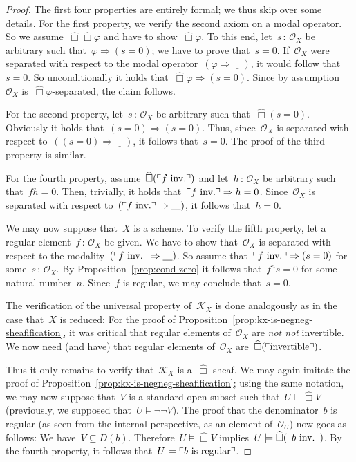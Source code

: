 \documentclass[10pt]{amsart}
\makeatletter
\theoremstyle{definition}
\theoremstyle{plain}
\theoremstyle{remark}
\renewcommand{\O}{\mathcal{O}}
\newcommand{\K}{\mathcal{K}}
\newcommand{\placeholder}{\underline{\quad}}
\newcommand{\?}{\,{:}\,}
\renewcommand{\_}{\mathpunct{.}\,}
\newcommand{\speak}[1]{\ulcorner\text{\textnormal{#1}}\urcorner}
\newcommand{\sdense}{{\widehat\Box}}
\newcommand{\inv}{inv.\@}
\newcommand{\notnot}{\emph{not not}\xspace}
\makeatother
\begin{document}
\begin{proof}The first four properties are entirely formal; we thus skip over
some details. For the first property, we verify the second axiom on a modal
operator. So we assume~$\sdense\sdense\varphi$ and have to show~$\sdense\varphi$. To
this end, let~$s\?\O_X$ be arbitrary such that~$\varphi \Rightarrow (s=0)$; we
have to prove that~$s = 0$. If~$\O_X$ were separated with respect to the modal
operator~$(\varphi \Rightarrow \placeholder)$, it would follow that~$s = 0$. So
unconditionally it holds that~$\sdense\varphi \Rightarrow (s=0)$. Since by
assumption~$\O_X$ is~$\sdense\varphi$-separated, the claim follows.

For the second property, let~$s\?\O_X$ be arbitrary such that~$\sdense(s = 0)$.
Obviously it holds that~$(s = 0) \Rightarrow (s = 0)$. Thus, since~$\O_X$ is
separated with respect to~$((s = 0) \Rightarrow \placeholder)$, it follows
that~$s = 0$. The proof of the third property is similar.

For the fourth property, assume~$\sdense(\speak{$f$ \inv})$ and let~$h\?\O_X$ be
arbitrary such that~$fh = 0$. Then, trivially, it holds that~$\speak{$f$ \inv}
\Rightarrow h = 0$. Since~$\O_X$ is separated with respect to~$(\speak{$f$
\inv} \Rightarrow \placeholder)$, it follows that~$h = 0$.

We may now suppose that~$X$ is a scheme. To verify the fifth property, let a
regular element~$f\?\O_X$ be given. We have to show that~$\O_X$ is separated
with respect to the modality~$(\speak{$f$ \inv} \Rightarrow \placeholder)$. So
assume that~$\speak{$f$ \inv} \Rightarrow (s = 0)$ for some~$s\?\O_X$. By
Proposition~\ref{prop:cond-zero} it follows that~$f^n s = 0$ for some natural
number~$n$. Since~$f$ is regular, we may conclude that~$s = 0$.

The verification of the universal property of~$\K_X$ is done analogously as in
the case that~$X$ is reduced: For the proof of
Proposition~\ref{prop:kx-is-negneg-sheafification}, it was critical that
regular elements of~$\O_X$ are \notnot invertible. We now need (and have) that
regular elements of~$\O_X$ are~$\sdense(\speak{invertible})$.

Thus it only remains to verify that~$\K_X$ is a~$\sdense$-sheaf. We may again imitate
the proof of Proposition~\ref{prop:kx-is-negneg-sheafification}; using the same
notation, we may now suppose that~$V$ is a standard open subset such that~$U \models \sdense
V$ (previously, we supposed that~$U \models \neg\neg V$). The proof that the
denominator~$b$ is regular (as seen from the internal perspective, as an
element of~$\O_U$) now goes as follows: We have~$V \subseteq
D(b)$. Therefore~$U \models \sdense V$ implies~$U \models \sdense(\speak{$b$ \inv})$. By
the fourth property, it follows that~$U \models \speak{$b$ is regular}$.
\end{proof}
\end{document}
